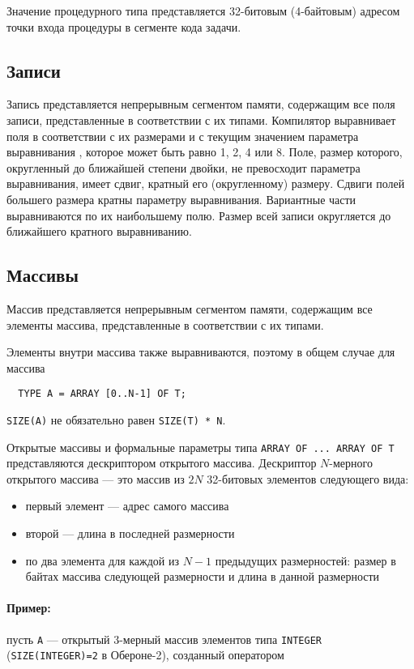 Значение процедурного типа представляется 32-битовым (4-байтовым)
адресом точки входа процедуры в сегменте кода задачи.

\subsection{Записи}\label{lowlevel:recrep}

Запись представляется непрерывным сегментом памяти, содержащим все
поля записи, представленные в соответствии с их типами. Компилятор
выравнивает поля в соответствии с их размерами и с текущим значением
параметра выравнивания , которое может быть равно 
1, 2, 4 или 8.
Поле, размер которого, округленный до ближайшей степени двойки, не 
превосходит параметра выравнивания, имеет сдвиг, кратный его 
(округленному) размеру. Сдвиги полей большего размера кратны параметру
выравнивания. Вариантные части выравниваются по их наибольшему полю. %
Размер всей записи округляется до ближайшего кратного выравниванию.

\subsection{Массивы}\label{lowlevel:opendesc}

Массив представляется непрерывным сегментом памяти, содержащим все
элементы массива, представленные в соответствии с их типами. 

Элементы внутри массива также выравниваются, поэтому в общем случае
для массива
\begin{verbatim}
  TYPE A = ARRAY [0..N-1] OF T;
\end{verbatim}
{\tt SIZE(A)} не обязательно равен {\tt SIZE(T) * N}.

Открытые массивы и формальные параметры типа
{\tt ARRAY OF ... ARRAY OF T} представляются дескриптором открытого массива.
Дескриптор $N$-мерного открытого массива --- это массив из
$2N$ 32-битовых элементов следующего вида:
\begin{itemize}
\item   первый элемент --- адрес самого массива
\item   второй --- длина в последней размерности
\item
по два элемента для каждой из $N-1$ предыдущих размерностей:
размер в байтах массива следующей размерности и длина в данной
размерности
\end{itemize}

\paragraph{Пример:} пусть {\tt A} --- открытый $3$-мерный массив
элементов типа
{\tt INTEGER} ({\tt SIZE(INTEGER)=2} в Обероне-2), созданный 
оператором

